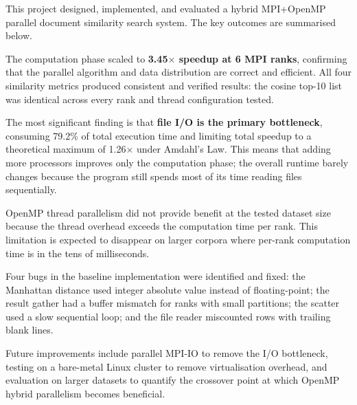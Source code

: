 \documentclass[12pt,a4paper]{article}
\begin{document}
This project designed, implemented, and evaluated a hybrid MPI+OpenMP
parallel document similarity search system. The key outcomes are
summarised below.

The computation phase scaled to \textbf{3.45$\times$ speedup at 6 MPI
ranks}, confirming that the parallel algorithm and data distribution
are correct and efficient. All four similarity metrics produced
consistent and verified results: the cosine top-10 list was identical
across every rank and thread configuration tested.

The most significant finding is that \textbf{file I/O is the primary
bottleneck}, consuming 79.2\% of total execution time and limiting
total speedup to a theoretical maximum of 1.26$\times$ under Amdahl's
Law. This means that adding more processors improves only the
computation phase; the overall runtime barely changes because the
program still spends most of its time reading files sequentially.

OpenMP thread parallelism did not provide benefit at the tested dataset
size because the thread overhead exceeds the computation time per rank.
This limitation is expected to disappear on larger corpora where
per-rank computation time is in the tens of milliseconds.

Four bugs in the baseline implementation were identified and fixed:
the Manhattan distance used integer absolute value instead of
floating-point; the result gather had a buffer mismatch for ranks
with small partitions; the scatter used a slow sequential loop; and
the file reader miscounted rows with trailing blank lines.

Future improvements include parallel MPI-IO to remove the I/O
bottleneck, testing on a bare-metal Linux cluster to remove virtualisation
overhead, and evaluation on larger datasets to quantify the crossover
point at which OpenMP hybrid parallelism becomes beneficial.

\clearpage
{}


\end{document}
